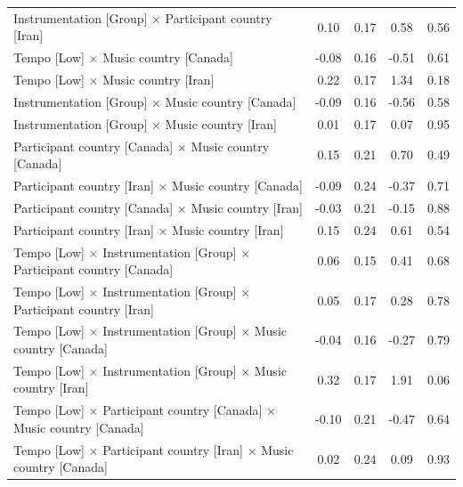 \documentclass[
  bookmarksnumbered]{article}
\begin{document}
\begin{table}[H]
{\begin{tabular}[t]{lcccc}
\hspace{1em}Instrumentation [Group] × Participant country [Iran] & 0.10 & 0.17 & 0.58 & 0.56\\
\hspace{1em}Tempo [Low] × Music country [Canada] & -0.08 & 0.16 & -0.51 & 0.61\\
\hspace{1em}Tempo [Low] × Music country [Iran] & 0.22 & 0.17 & 1.34 & 0.18\\
\hspace{1em}Instrumentation [Group] × Music country [Canada] & -0.09 & 0.16 & -0.56 & 0.58\\
\hspace{1em}Instrumentation [Group] × Music country [Iran] & 0.01 & 0.17 & 0.07 & 0.95\\
\hspace{1em}Participant country [Canada] × Music country [Canada] & 0.15 & 0.21 & 0.70 & 0.49\\
\hspace{1em}Participant country [Iran] × Music country [Canada] & -0.09 & 0.24 & -0.37 & 0.71\\
\hspace{1em}Participant country [Canada] × Music country [Iran] & -0.03 & 0.21 & -0.15 & 0.88\\
\hspace{1em}Participant country [Iran] × Music country [Iran] & 0.15 & 0.24 & 0.61 & 0.54\\
\hspace{1em}Tempo [Low] × Instrumentation [Group] × Participant country [Canada] & 0.06 & 0.15 & 0.41 & 0.68\\
\hspace{1em}Tempo [Low] × Instrumentation [Group] × Participant country [Iran] & 0.05 & 0.17 & 0.28 & 0.78\\
\hspace{1em}Tempo [Low] × Instrumentation [Group] × Music country [Canada] & -0.04 & 0.16 & -0.27 & 0.79\\
\hspace{1em}Tempo [Low] × Instrumentation [Group] × Music country [Iran] & 0.32 & 0.17 & 1.91 & 0.06\\
\hspace{1em}Tempo [Low] × Participant country [Canada] × Music country [Canada] & -0.10 & 0.21 & -0.47 & 0.64\\
\hspace{1em}Tempo [Low] × Participant country [Iran] × Music country [Canada] & 0.02 & 0.24 & 0.09 & 0.93\\

\end{tabular}}
\end{table}
\end{document}
